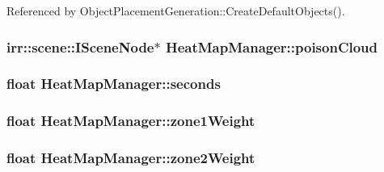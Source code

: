 Referenced by Object\-Placement\-Generation\-::\-Create\-Default\-Objects().

\hypertarget{class_heat_map_manager_a506da7726ec2f7d989ad407edd7b365d}{
\subsubsection[{poison\-Cloud}]{\setlength{\rightskip}{0pt plus 5cm}irr\-::scene\-::\-I\-Scene\-Node$\ast$ Heat\-Map\-Manager\-::poison\-Cloud\hspace{0.3cm}{\ttfamily [private]}}}\label{class_heat_map_manager_a506da7726ec2f7d989ad407edd7b365d}
\hypertarget{class_heat_map_manager_a506cd0b3cef22e132ae74b5b8d264ed4}{
\subsubsection[{seconds}]{\setlength{\rightskip}{0pt plus 5cm}float Heat\-Map\-Manager\-::seconds\hspace{0.3cm}{\ttfamily [private]}}}\label{class_heat_map_manager_a506cd0b3cef22e132ae74b5b8d264ed4}
\hypertarget{class_heat_map_manager_a428c9124cfc0e4667e5d935fce050e3f}{
\subsubsection[{zone1\-Weight}]{\setlength{\rightskip}{0pt plus 5cm}float Heat\-Map\-Manager\-::zone1\-Weight\hspace{0.3cm}{\ttfamily [private]}}}\label{class_heat_map_manager_a428c9124cfc0e4667e5d935fce050e3f}
\hypertarget{class_heat_map_manager_a82299e638dd3f8e4c6e7cbf4706c0d0b}{
\subsubsection[{zone2\-Weight}]{\setlength{\rightskip}{0pt plus 5cm}float Heat\-Map\-Manager\-::zone2\-Weight\hspace{0.3cm}{\ttfamily [private]}}}\label{class_heat_map_manager_a82299e638dd3f8e4c6e7cbf4706c0d0b}
